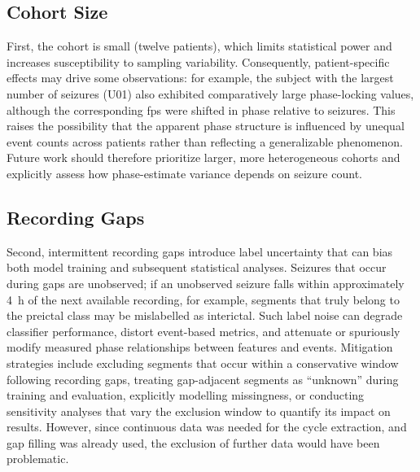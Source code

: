 \subsection{Cohort Size} 
First, the cohort is small (twelve patients), which limits statistical power and increases susceptibility to sampling variability.
Consequently, patient-specific effects may drive some observations: for example, the subject with the largest number of seizures (U01) also exhibited comparatively large phase-locking values, although the corresponding \glspl{fp} were shifted in phase relative to seizures.
This raises the possibility that the apparent phase structure is influenced by unequal event counts across patients rather than reflecting a generalizable phenomenon.
Future work should therefore prioritize larger, more heterogeneous cohorts and explicitly assess how phase-estimate variance depends on seizure count.

\subsection{Recording Gaps} 
Second, intermittent recording gaps introduce label uncertainty that can bias both model training and subsequent statistical analyses.
Seizures that occur during gaps are unobserved; if an unobserved seizure falls within approximately \SI{4}{\hour} of the next available recording, for example, segments that truly belong to the preictal class may be mislabelled as interictal.
Such label noise can degrade classifier performance, distort event-based metrics, and attenuate or spuriously modify measured phase relationships between features and events.
Mitigation strategies include excluding segments that occur within a conservative window following recording gaps, treating gap-adjacent segments as ``unknown'' during training and evaluation, explicitly modelling missingness, or conducting sensitivity analyses that vary the exclusion window to quantify its impact on results.
However, since continuous data was needed for the cycle extraction, and gap filling was already used, the exclusion of further data would have been problematic.

